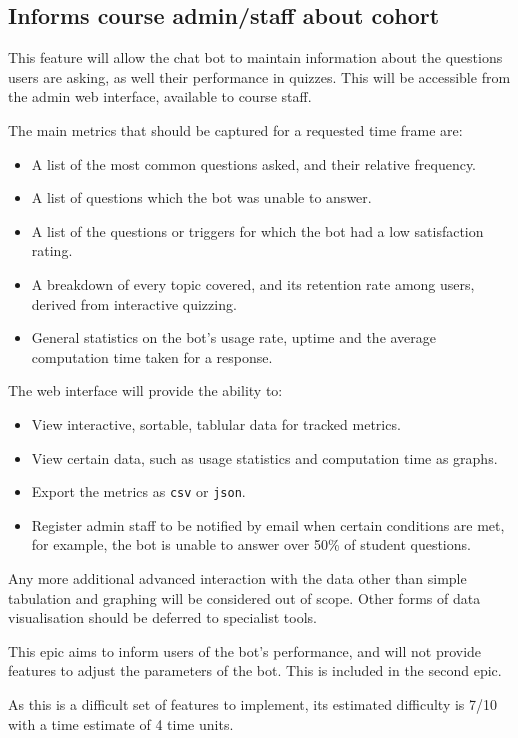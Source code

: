 \documentclass{article}
\begin{document}
\subsection{Informs course admin/staff about cohort}

This feature will allow the chat bot to maintain information about the questions users are asking, as well their performance in quizzes. This will be accessible from the admin web interface, available to course staff.

The main metrics that should be captured for a requested time frame are:
\begin{itemize}
  \item A list of the most common questions asked, and their relative frequency.
  \item A list of questions which the bot was unable to answer.
  \item A list of the questions or triggers for which the bot had a low satisfaction rating.
  \item A breakdown of every topic covered, and its retention rate among users, derived from interactive quizzing.
  \item General statistics on the bot's usage rate, uptime and the average computation time taken for a response.
\end{itemize}

The web interface will provide the ability to:
\begin{itemize}
  \item View interactive, sortable, tablular data for tracked metrics.
  \item View certain data, such as usage statistics and computation time as graphs.
  \item Export the metrics as \texttt{csv} or \texttt{json}.
  \item Register admin staff to be notified by email when certain conditions are met, for example, the bot is unable to answer over 50\% of student questions.
\end{itemize}

Any more additional advanced interaction with the data other than simple tabulation and graphing will be considered out of scope. Other forms of data visualisation should be deferred to specialist tools.

This epic aims to inform users of the bot's performance, and will not provide features to adjust the parameters of the bot. This is included in the second epic. 

As this is a difficult set of features to implement, its estimated difficulty is 7/10 with a time estimate of 4 time units.
\end{document}
